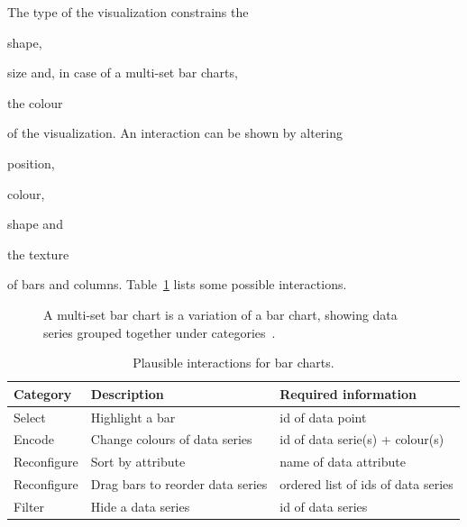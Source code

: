 The type of the visualization constrains the
\begin{enumerate*}[label=(\arabic*)]
    \item shape,
    \item size and, in case of a multi-set bar charts,
    \item the colour
\end{enumerate*}
of the visualization.
An interaction can be shown by altering
\begin{enumerate*}[label=(\arabic*)]
    \item position,
    \item colour,
    \item shape and
    \item the texture
\end{enumerate*}
of bars and columns.
Table~\ref{tab:analysis:bar-charts:interactions} lists some possible interactions.

\begin{figure}
  \begin{center}
    \qquad
    \caption{A multi-set bar chart is a variation of a bar chart, showing data series grouped together under categories~\parencite{VisualizationCatalogue2017}.}
    \label{fig:analysis:bar-charts}
  \end{center}
\end{figure}


\begin{table}[H]
  \centering
  \caption{Plausible interactions for bar charts.}
  \label{tab:analysis:bar-charts:interactions}
  \begin{tabularx}{\linewidth}{lXX}
    \bf Category & \bf Description & \bf Required information \\
    \hline
    Select & Highlight a bar & id of data point \\
    Encode & Change colours of data series & id of data serie(s) + colour(s) \\
    Reconfigure & Sort by attribute & name of data attribute \\
    Reconfigure & Drag bars to reorder data series & ordered list of ids of data series \\
    Filter & Hide a data series & id of data series \\
  \end{tabularx}
\end{table}


